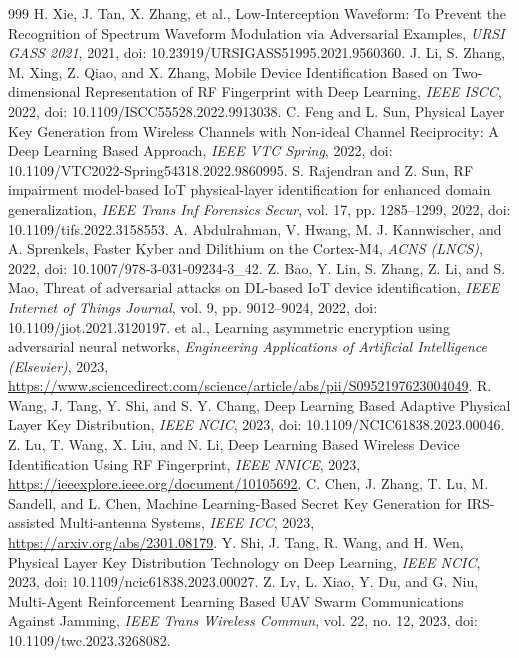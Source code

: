 \documentclass[10.5pt,compsoc,winfonts]{ICN}
\begin{document}
\begin{thebibliography}{999}
H. Xie, J. Tan, X. Zhang, et al., Low-Interception Waveform: To Prevent the Recognition of Spectrum Waveform Modulation via Adversarial Examples, \emph{URSI GASS 2021}, 2021, doi: 10.23919/URSIGASS51995.2021.9560360.
J. Li, S. Zhang, M. Xing, Z. Qiao, and X. Zhang, Mobile Device Identification Based on Two-dimensional Representation of RF Fingerprint with Deep Learning, \emph{IEEE ISCC}, 2022, doi: 10.1109/ISCC55528.2022.9913038.
C. Feng and L. Sun, Physical Layer Key Generation from Wireless Channels with Non-ideal Channel Reciprocity: A Deep Learning Based Approach, \emph{IEEE VTC Spring}, 2022, doi: 10.1109/VTC2022-Spring54318.2022.9860995.
S. Rajendran and Z. Sun, RF impairment model-based IoT physical-layer identification for enhanced domain generalization, \emph{IEEE Trans Inf Forensics Secur}, vol. 17, pp. 1285–1299, 2022, doi: 10.1109/tifs.2022.3158553.
A. Abdulrahman, V. Hwang, M. J. Kannwischer, and A. Sprenkels, Faster Kyber and Dilithium on the Cortex-M4, \emph{ACNS (LNCS)}, 2022, doi: 10.1007/978-3-031-09234-3\_42.
Z. Bao, Y. Lin, S. Zhang, Z. Li, and S. Mao, Threat of adversarial attacks on DL-based IoT device identification, \emph{IEEE Internet of Things Journal}, vol. 9, pp. 9012–9024, 2022, doi: 10.1109/jiot.2021.3120197.
et al., Learning asymmetric encryption using adversarial neural networks, \emph{Engineering Applications of Artificial Intelligence (Elsevier)}, 2023, \url{https://www.sciencedirect.com/science/article/abs/pii/S0952197623004049}.
R. Wang, J. Tang, Y. Shi, and S. Y. Chang, Deep Learning Based Adaptive Physical Layer Key Distribution, \emph{IEEE NCIC}, 2023, doi: 10.1109/NCIC61838.2023.00046.
Z. Lu, T. Wang, X. Liu, and N. Li, Deep Learning Based Wireless Device Identification Using RF Fingerprint, \emph{IEEE NNICE}, 2023, \url{https://ieeexplore.ieee.org/document/10105692}.
C. Chen, J. Zhang, T. Lu, M. Sandell, and L. Chen, Machine Learning-Based Secret Key Generation for IRS-assisted Multi-antenna Systems, \emph{IEEE ICC}, 2023, \url{https://arxiv.org/abs/2301.08179}.
Y. Shi, J. Tang, R. Wang, and H. Wen, Physical Layer Key Distribution Technology on Deep Learning, \emph{IEEE NCIC}, 2023, doi: 10.1109/ncic61838.2023.00027.
Z. Lv, L. Xiao, Y. Du, and G. Niu, Multi-Agent Reinforcement Learning Based UAV Swarm Communications Against Jamming, \emph{IEEE Trans Wireless Commun}, vol. 22, no. 12, 2023, doi: 10.1109/twc.2023.3268082.

\end{thebibliography}
\end{document}
